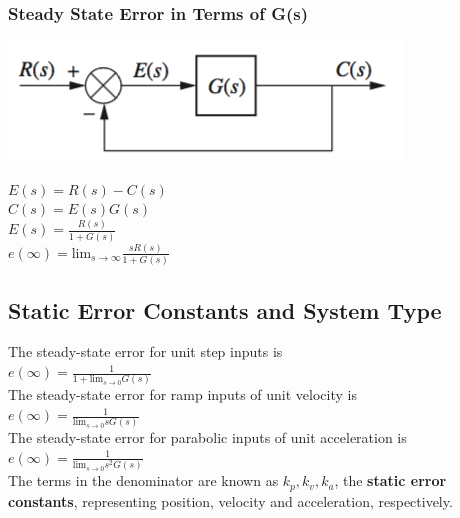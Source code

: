 \documentclass[11pt]{article}
\begin{document}
    \subsubsection{Steady State Error in Terms of G(s)}

    \begin{center}
        \includegraphics[width=300 px]{img/unityfeedback} \\
    \end{center}

    \begin{center}
        $E(s) = R(s) - C(s)$ \\
        $C(s) = E(s)G(s)$ \\ 
        $E(s) = \frac{R(s)}{1 + G(s)}$ \\
        $e(\infty) = \text{lim}_{s\rightarrow \infty} \frac{sR(s)}{1 + G(s)} $ \\ 
    \end{center}

    \subsection{Static Error Constants and System Type}

    The steady-state error for unit step inputs is \\ 

    $e(\infty) = \frac{1}{1 + \text{lim}_{s\rightarrow 0} G(s)}$ \\
    
    The steady-state error for ramp inputs of unit velocity is \\
    
    $e(\infty) = \frac{1}{\text{lim}_{s\rightarrow 0} sG(s)}$ \\

    The steady-state error for parabolic inputs of unit acceleration is \\
    
    $e(\infty) = \frac{1}{\text{lim}_{s\rightarrow 0} s^2G(s)}$ \\


    The terms in the denominator are known as $k_p, k_v, k_a$, the \textbf{static error constants}, representing position, velocity and acceleration, respectively. \\
    
\end{document}
